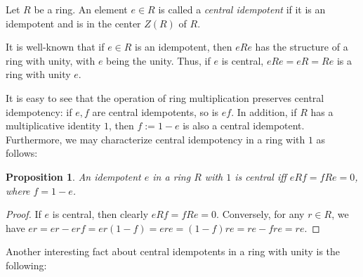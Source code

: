 \documentclass[12pt]{article}
\newtheorem{prop}{Proposition}
\begin{document}
Let $R$ be a ring.  An element $e\in R$ is called a \emph{central idempotent} if it is an idempotent and is in the center $Z(R)$ of $R$.

It is well-known that if $e\in R$ is an idempotent, then $eRe$ has the structure of a ring with unity, with $e$ being the unity.  Thus, if $e$ is central, $eRe=eR=Re$ is a ring with unity $e$.

It is easy to see that the operation of ring multiplication preserves central idempotency: if $e,f$ are central idempotents, so is $ef$.  In addition, if $R$ has a multiplicative identity $1$, then $f:=1-e$ is also a central idempotent.  Furthermore, we may characterize central idempotency in a ring with $1$ as follows:

\begin{prop} An idempotent $e$ in a ring $R$ with $1$ is central iff $eRf=fRe=0$, where $f=1-e$. \end{prop}
\begin{proof}  If $e$ is central, then clearly $eRf=fRe=0$.  Conversely, for any $r\in R$, we have $er = er-erf = er(1-f) = ere = (1-f)re = re-fre = re$.
\end{proof}

Another interesting fact about central idempotents in a ring with unity is the following:
\end{document}

